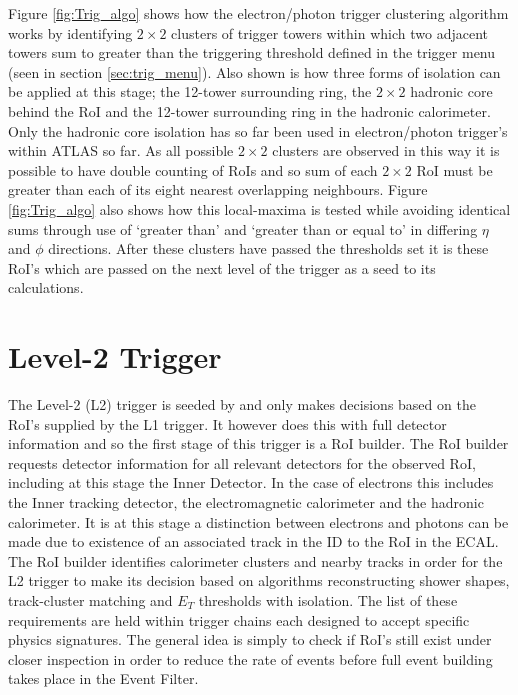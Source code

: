 	Figure \ref{fig:Trig_algo} shows how the electron/photon trigger clustering algorithm works by identifying $2 \times 2$ clusters of trigger towers within which two adjacent towers sum to greater than the triggering threshold defined in the trigger menu (seen in section \ref{sec:trig_menu}). Also shown is how three forms of isolation can be applied at this stage; the 12-tower surrounding ring, the $2 \times 2$ hadronic core behind the RoI and the 12-tower surrounding ring in the hadronic calorimeter. Only the hadronic core isolation has so far been used in electron/photon trigger's within ATLAS so far. 
	As all possible $2 \times 2$ clusters are observed in this way it is possible to have double counting of RoIs and so sum of each $2 \times 2$ RoI must be greater than each of its eight nearest overlapping neighbours. Figure \ref{fig:Trig_algo} also shows how this local-maxima is tested while avoiding identical sums through use of `greater than' and `greater than or equal to' in differing $\eta$ and $\phi$ directions. 
	After these clusters have passed the thresholds set it is these RoI's which are passed on the next level of the trigger as a seed to its calculations.





\section{Level-2 Trigger}

	The Level-2 (L2) trigger is seeded by and only makes decisions based on the RoI's supplied by the L1 trigger. It however does this with full detector information and so the first stage of this trigger is a RoI builder. The RoI builder requests detector information for all relevant detectors for the observed RoI, including at this stage the Inner Detector. In the case of electrons this includes the Inner tracking detector, the electromagnetic calorimeter and the hadronic calorimeter. It is at this stage a distinction between electrons and photons can be made due to existence of an associated track in the ID to the RoI in the ECAL. The RoI builder identifies calorimeter clusters and nearby tracks in order for the L2 trigger to make its decision based on algorithms reconstructing shower shapes, track-cluster matching and $E_{T}$ thresholds with isolation. The list of these requirements are held within trigger chains each designed to accept specific physics signatures. The general idea is simply to check if RoI's still exist under closer inspection in order to reduce the rate of events before full event building takes place in the Event Filter.




